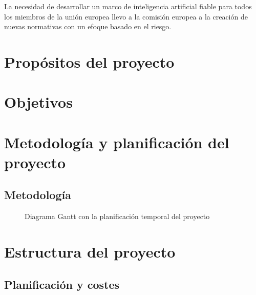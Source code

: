 La necesidad de desarrollar un marco de inteligencia artificial fiable para todos los miembros de la unión europea llevo a la comisión europea a la creación de nuevas normativas con un efoque basado en el riesgo.


\section{Propósitos del proyecto}

\section{Objetivos}

\section{Metodología y planificación del proyecto}


\subsection{Metodología}

\begin{landscape}

    \begin{figure}[H]
        \centerline{}
        \caption{Diagrama Gantt con la planificación temporal del proyecto}
        \label{fig:diagrama-gantt}
    \end{figure}

\end{landscape}
\restoregeometry




\section{Estructura del proyecto}

\subsection{Planificación y costes}

